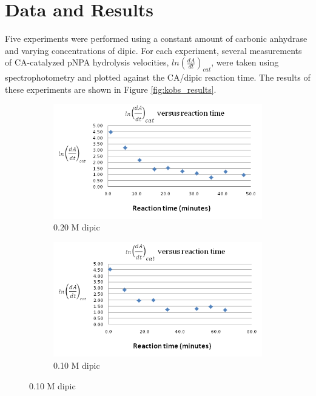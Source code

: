 \section{Data and Results}
Five experiments were performed using a constant amount of carbonic anhydrase and varying concentrations of dipic. For each experiment, several measurements of CA-catalyzed pNPA hydrolysis velocities, $ln \left(\frac{dA}{dt}\right)_{cat}$, were taken using spectrophotometry and plotted against the CA/dipic reaction time. The results of these experiments are shown in Figure \ref{fig:kobs_results}.
\begin{figure}[h]
        \begin{subfigure}{0.5\textwidth}
                \includegraphics[width=\textwidth]{./Figures/20M_dipic_readings.png}
                \caption{0.20 M dipic}
                \label{fig:0.20M_dipic_readings}
        \end{subfigure}\begin{subfigure}{0.5\textwidth}
                \includegraphics[width=\textwidth]{./Figures/10M_dipic_readings.png}
                \caption{0.10 M dipic}
                \label{fig:0.10M_dipic_readings}

\end{subfigure}
\end{figure}
